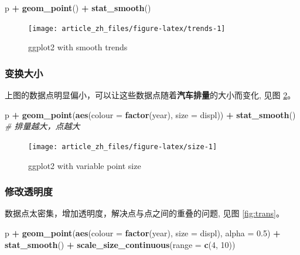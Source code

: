 \documentclass[]{article}
\newenvironment{Shaded}{\begin{snugshade}}{\end{snugshade}}
\newcommand{\CommentTok}[1]{\textcolor[rgb]{0.56,0.35,0.01}{\textit{#1}}}
\newcommand{\DataTypeTok}[1]{\textcolor[rgb]{0.13,0.29,0.53}{#1}}
\newcommand{\DecValTok}[1]{\textcolor[rgb]{0.00,0.00,0.81}{#1}}
\newcommand{\FloatTok}[1]{\textcolor[rgb]{0.00,0.00,0.81}{#1}}
\newcommand{\KeywordTok}[1]{\textcolor[rgb]{0.13,0.29,0.53}{\textbf{#1}}}
\newcommand{\NormalTok}[1]{#1}
\newcommand{\OperatorTok}[1]{\textcolor[rgb]{0.81,0.36,0.00}{\textbf{#1}}}
\newcommand{\StringTok}[1]{\textcolor[rgb]{0.31,0.60,0.02}{#1}}
\begin{document}
\begin{Shaded}
\begin{Highlighting}[]
\NormalTok{p }\OperatorTok{+}\StringTok{ }\KeywordTok{geom_point}\NormalTok{() }\OperatorTok{+}\StringTok{ }\KeywordTok{stat_smooth}\NormalTok{()}
\end{Highlighting}
\end{Shaded}

\begin{figure}

{\centering \texttt{[image: article\_zh\_files/figure-latex/trends-1]} 

}

\caption{ggplot2 with smooth trends}\label{fig:trends}
\end{figure}

\subsubsection{变换大小}

上图的数据点明显偏小，可以让这些数据点随着\textbf{汽车排量}的大小而变化,
见图 \ref{fig:size}。

\begin{Shaded}
\begin{Highlighting}[]
\NormalTok{p }\OperatorTok{+}\StringTok{ }\KeywordTok{geom_point}\NormalTok{(}\KeywordTok{aes}\NormalTok{(}\DataTypeTok{colour =} \KeywordTok{factor}\NormalTok{(year), }\DataTypeTok{size =}\NormalTok{ displ)) }\OperatorTok{+}\StringTok{ }
\StringTok{  }\KeywordTok{stat_smooth}\NormalTok{()   }\CommentTok{# 排量越大，点越大}
\end{Highlighting}
\end{Shaded}

\begin{figure}

{\centering \texttt{[image: article\_zh\_files/figure-latex/size-1]} 

}

\caption{ggplot2 with variable point size}\label{fig:size}
\end{figure}

\subsubsection{修改透明度}

数据点太密集，增加透明度，解决点与点之间的重叠的问题, 见图
\ref{fig:trans}。

\begin{Shaded}
\begin{Highlighting}[]
\NormalTok{p }\OperatorTok{+}\StringTok{ }\KeywordTok{geom_point}\NormalTok{(}\KeywordTok{aes}\NormalTok{(}\DataTypeTok{colour =} \KeywordTok{factor}\NormalTok{(year),}
                   \DataTypeTok{size =}\NormalTok{ displ), }\DataTypeTok{alpha =} \FloatTok{0.5}\NormalTok{) }\OperatorTok{+}
\StringTok{  }\KeywordTok{stat_smooth}\NormalTok{() }\OperatorTok{+}\StringTok{ }\KeywordTok{scale_size_continuous}\NormalTok{(}\DataTypeTok{range =} \KeywordTok{c}\NormalTok{(}\DecValTok{4}\NormalTok{, }\DecValTok{10}\NormalTok{))}
\end{Highlighting}
\end{Shaded}
\end{document}
